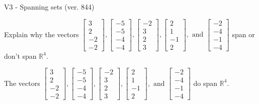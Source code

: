 \begin{exercise}
  \begin{exerciseTitle}V3 - Spanning sets (ver. 844)\end{exerciseTitle}
  \begin{exerciseStatement}
    Explain why the vectors \(\left[\begin{array}{r}
3 \\
2 \\
-2 \\
-2
\end{array}\right] , \left[\begin{array}{r}
-5 \\
-5 \\
-4 \\
-4
\end{array}\right] , \left[\begin{array}{r}
-2 \\
3 \\
2 \\
3
\end{array}\right] , \left[\begin{array}{r}
2 \\
1 \\
-1 \\
2
\end{array}\right] , \text{ and } \left[\begin{array}{r}
-2 \\
-4 \\
-1 \\
-4
\end{array}\right]\) span or don't span \(\mathbb{R}^4\). 
	


  \end{exerciseStatement}
  \begin{exerciseAnswer}
   The vectors \(\left[\begin{array}{r}
3 \\
2 \\
-2 \\
-2
\end{array}\right] , \left[\begin{array}{r}
-5 \\
-5 \\
-4 \\
-4
\end{array}\right] , \left[\begin{array}{r}
-2 \\
3 \\
2 \\
3
\end{array}\right] , \left[\begin{array}{r}
2 \\
1 \\
-1 \\
2
\end{array}\right] , \text{ and } \left[\begin{array}{r}
-2 \\
-4 \\
-1 \\
-4
\end{array}\right]\) 
  	 do  
	span \(\mathbb{R}^4\).
  



\end{exerciseAnswer}
\end{exercise}
